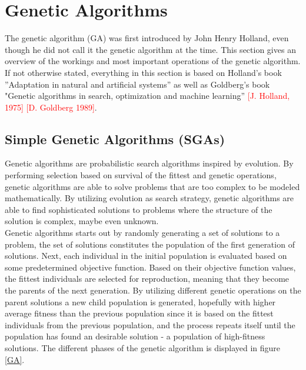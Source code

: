 \documentclass{article}
\begin{document}



\section{Genetic Algorithms}


The genetic algorithm (GA) was first introduced by John Henry Holland, even though he did not call it the genetic algorithm at the time. This section gives an overview of the workings and most important operations of the genetic algorithm. If not otherwise stated, everything in this section is based on Holland's book ''Adaptation in natural and artificial systems'' as well as Goldberg's book "Genetic algorithms in search, optimization and machine learning'' \textcolor{red}{[J. Holland, 1975]} \textcolor{red}{[D. Goldberg 1989]}.




\subsection{Simple Genetic Algorithms (SGAs)}
Genetic algorithms are probabilistic search algorithms inspired by evolution. By performing selection based on survival of the fittest and genetic operations, genetic algorithms are able to solve problems that are too complex to be modeled mathematically. By utilizing evolution as search strategy, genetic algorithms are able to find sophisticated solutions to problems where the structure of the solution is complex, maybe even unknown. \\


\noindent Genetic algorithms starts out by randomly generating a set of solutions to a problem, the set of solutions constitutes the population of the first generation of solutions. Next, each individual in the initial population is evaluated based on some predetermined objective function. Based on their objective function values, the fittest individuals are selected for reproduction, meaning that they become the parents of the next generation. By utilizing different genetic operations on the parent solutions a new child population is generated, hopefully with higher average fitness than the previous population since it is based on the fittest individuals from the previous population, and the process repeats itself until the population has found an desirable solution - a population of high-fitness solutions. The different phases of the genetic algorithm is displayed in figure \ref{GA}.\\
\end{document}
